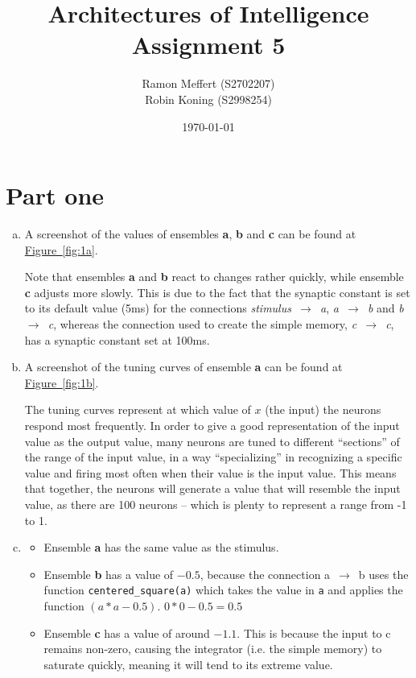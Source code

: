 \documentclass[12pt, a4paper, titlepage]{article}
\title{Architectures of Intelligence \\ Assignment 5}
\author{Ramon Meffert (S2702207) \\ Robin Koning (S2998254)}
\date{\today}
\begin{document}
\maketitle
\section{Part one} %
\label{sec:part_one}
\begin{enumerate}[a.]
	
	\item A screenshot of the values of ensembles \textbf{a}, \textbf{b} and \textbf{c} can be found at \hyperref[fig:1a]{Figure~\ref{fig:1a}}. 
	
	Note that ensembles \textbf{a} and \textbf{b} react to changes rather quickly, while ensemble \textbf{c} adjusts more slowly. This is due to the fact that the synaptic constant is set to its default value (5ms) for the connections \emph{stimulus~$\rightarrow$~a}, \emph{a~$\rightarrow$~b} and \emph{b~$\rightarrow$~c}, whereas the connection used to create the simple memory, \emph{c~$\rightarrow$~c}, has a synaptic constant set at 100ms.
	
	\item A screenshot of the tuning curves of ensemble \textbf{a} can be found at \hyperref[fig:1b]{Figure~\ref{fig:1b}}.
	
	The tuning curves represent at which value of $x$ (the input) the neurons respond most frequently. In order to give a good representation of the input value as the output value, many neurons are tuned to different ``sections'' of the range of the input value, in a way ``specializing'' in recognizing a specific value and firing most often when their value is the input value. This means that together, the neurons will generate a value that will resemble the input value, as there are 100 neurons -- which is plenty to represent a range from -1 to 1.
	
	\item 
		\begin{itemize}
			\item Ensemble \textbf{a} has the same value as the stimulus.
			\item Ensemble \textbf{b} has a value of $-0.5$, because the connection a~$\rightarrow$~b uses the function \texttt{centered\_square(a)} which takes the value in \texttt{a} and applies the function $(a*a-0.5)$. $0*0-0.5 = 0.5$
			\item Ensemble \textbf{c} has a value of around $-1.1$. This is because the input to c remains non-zero, causing the integrator (i.e. the simple memory) to saturate quickly, meaning it will tend to its extreme value.
		\end{itemize}
\end{enumerate}
\end{document}
